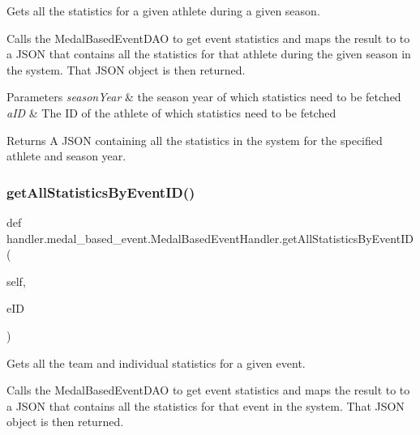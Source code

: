Gets all the statistics for a given athlete during a given season. 

Calls the Medal\+Based\+Event\+D\+AO to get event statistics and maps the result to to a J\+S\+ON that contains all the statistics for that athlete during the given season in the system. That J\+S\+ON object is then returned.


\begin{DoxyParams}{Parameters}
{\em season\+Year} & the season year of which statistics need to be fetched \\
\hline
{\em a\+ID} & The ID of the athlete of which statistics need to be fetched\\
\hline
\end{DoxyParams}
\begin{DoxyReturn}{Returns}
A J\+S\+ON containing all the statistics in the system for the specified athlete and season year. 
\end{DoxyReturn}
\mbox{\label{classhandler_1_1medal__based__event_1_1_medal_based_event_handler_a32e8ff028eb835d5a43c7b609774d696}} 
\subsubsection{\texorpdfstring{get\+All\+Statistics\+By\+Event\+I\+D()}{getAllStatisticsByEventID()}}
{\footnotesize\ttfamily def handler.\+medal\+\_\+based\+\_\+event.\+Medal\+Based\+Event\+Handler.\+get\+All\+Statistics\+By\+Event\+ID (\begin{DoxyParamCaption}\item[{}]{self,  }\item[{}]{e\+ID }\end{DoxyParamCaption})}



Gets all the team and individual statistics for a given event. 

Calls the Medal\+Based\+Event\+D\+AO to get event statistics and maps the result to to a J\+S\+ON that contains all the statistics for that event in the system. That J\+S\+ON object is then returned.


